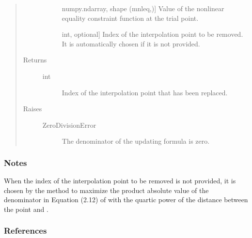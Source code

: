 \documentclass[letterpaper,10pt,english]{sphinxmanual}
\begin{document}
\begin{fulllineitems}
\begin{fulllineitems}
\begin{quote}
\begin{description}
\begin{description}
\item[{}] \leavevmode{[}numpy.ndarray, shape (mnleq,){]}
\sphinxAtStartPar
Value of the nonlinear equality constraint function at the trial
point.

\item[{}] \leavevmode{[}int, optional{]}
\sphinxAtStartPar
Index of the interpolation point to be removed. It is automatically
chosen if it is not provided.

\end{description}

\item[{Returns}] \leavevmode\begin{description}
\item[{int}] \leavevmode
\sphinxAtStartPar
Index of the interpolation point that has been replaced.

\end{description}

\item[{Raises}] \leavevmode\begin{description}
\item[{ZeroDivisionError}] \leavevmode
\sphinxAtStartPar
The denominator of the updating formula is zero.

\end{description}

\end{description}\end{quote}
\subsubsection*{Notes}

\sphinxAtStartPar
When the index  of the interpolation point to be removed is not
provided, it is chosen by the method to maximize the product absolute
value of the denominator in Equation (2.12) of  with the quartic
power of the distance between the point and .
\subsubsection*{References}

\sphinxAtStartPar
{}

\end{fulllineitems}


\end{fulllineitems}
\end{document}
